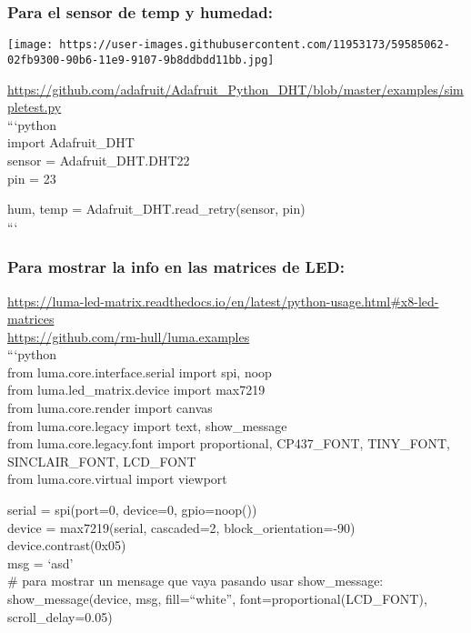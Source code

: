 \subsubsection{Para el \textbf{sensor} de temp y
humedad:}\label{para-el-sensor-de-temp-y-humedad}

\texttt{[image: https://user-images.githubusercontent.com/11953173/59585062-02fb9300-90b6-11e9-9107-9b8ddbdd11bb.jpg]}

\url{https://github.com/adafruit/Adafruit_Python_DHT/blob/master/examples/simpletest.py}\\
```python\\ import Adafruit\_DHT\\ sensor = Adafruit\_DHT.DHT22\\ pin =
23

hum, temp = Adafruit\_DHT.read\_retry(sensor, pin)\\ ```

\subsubsection{Para mostrar la info en las \textbf{matrices de
LED}:}\label{para-mostrar-la-info-en-las-matrices-de-led}

\url{https://luma-led-matrix.readthedocs.io/en/latest/python-usage.html\#x8-led-matrices}\\\url{https://github.com/rm-hull/luma.examples}\\
```python\\ from luma.core.interface.serial import spi, noop\\ from
luma.led\_matrix.device import max7219\\ from luma.core.render import
canvas\\ from luma.core.legacy import text, show\_message\\ from
luma.core.legacy.font import proportional, CP437\_FONT, TINY\_FONT,
SINCLAIR\_FONT, LCD\_FONT\\ from luma.core.virtual import viewport

serial = spi(port=0, device=0, gpio=noop())\\ device = max7219(serial,
cascaded=2, block\_orientation=-90)\\ device.contrast(0x05)\\ msg =
`asd'\\ \# para mostrar un mensage que vaya pasando usar
show\_message:\\ show\_message(device, msg, fill=``white'',
font=proportional(LCD\_FONT), scroll\_delay=0.05)

